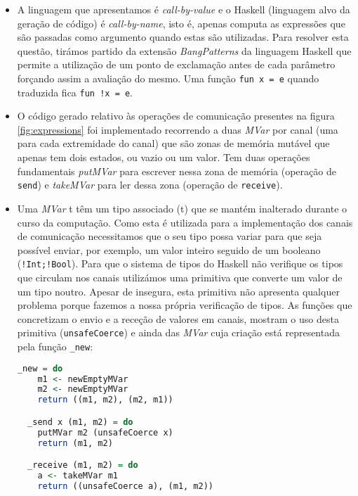 \begin{itemize}
\item  A linguagem que apresentamos é \textit{call-by-value} e o Haskell (linguagem alvo da geração de código) é \textit{call-by-name}, isto é, apenas computa as expressões que são passadas como argumento quando estas são utilizadas. Para resolver esta questão, tirámos partido da extensão \textit{BangPatterns} da linguagem Haskell que permite a utilização de um ponto de exclamação antes de cada parâmetro forçando assim a avaliação do mesmo. Uma função \lstinline"fun x = e" quando traduzida fica \lstinline"fun !x = e".
\newline
\item O código gerado relativo às operações de comunicação presentes na figura \ref{fig:expressions} foi implementado recorrendo a duas \textit{MVar} por canal (uma para cada extremidade do canal) que são zonas de memória mutável que apenas tem dois estados, ou vazio ou um valor. Tem duas operações fundamentais \textit{putMVar} para escrever nessa zona de memória (operação de \lstinline"send") e \textit{takeMVar} para ler dessa zona (operação de \lstinline"receive").
\newline %
\item Uma \textit{MVar} t têm um tipo associado (t) que se mantém inalterado durante o curso da computação. Como esta é utilizada para a implementação dos canais de comunicação necessitamos que o seu tipo possa variar para que seja possível enviar, por exemplo, um valor inteiro seguido de um booleano (\lstinline"!Int;!Bool"). Para que o sistema de tipos do Haskell não verifique os tipos que circulam nos canais utilizámos uma primitiva que converte um valor de um tipo noutro. Apesar de insegura, esta primitiva não apresenta qualquer problema porque fazemos a nossa própria verificação de tipos.
  As funções que concretizam o envio e a receção de valores em canais, mostram o uso desta primitiva (\lstinline|unsafeCoerce|) e ainda das \textit{MVar} cuja criação está representada pela função \lstinline|_new|:
\begin{lstlisting}[language=Haskell, style=eclipse-Haskell]
  _new = do
    m1 <- newEmptyMVar
    m2 <- newEmptyMVar
    return ((m1, m2), (m2, m1))

  _send x (m1, m2) = do
    putMVar m2 (unsafeCoerce x)
    return (m1, m2)

  _receive (m1, m2) = do
    a <- takeMVar m1
    return ((unsafeCoerce a), (m1, m2))
\end{lstlisting}


\end{itemize}
